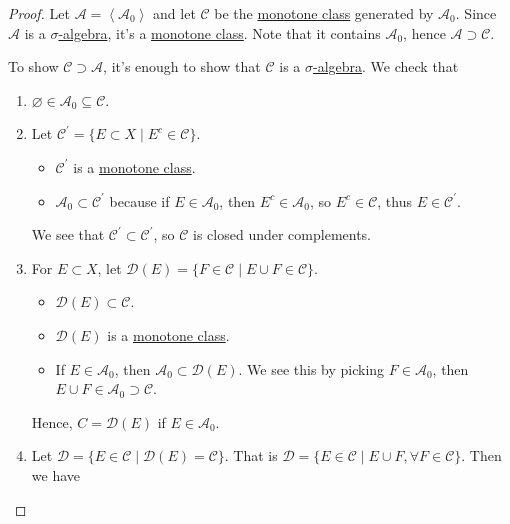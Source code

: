 \begin{proof}
	Let \(\mathcal{A}  = \left< \mathcal{A} _0 \right> \) and let \(\mathcal{C} \) be the \hyperref[def:monotone-class]{monotone class} generated by \(\mathcal{A} _0\). Since \(\mathcal{A} \) is a \hyperref[def:sigma-algebra]{\(\sigma\)-algebra}, it's a \hyperref[def:monotone-class]{monotone class}. Note that it contains \(\mathcal{A} _0\), hence \(\mathcal{A} \supset \mathcal{C} \).

	To show \(\mathcal{C} \supset \mathcal{A} \), it's enough to show that \(\mathcal{C} \) is a \hyperref[def:sigma-algebra]{\(\sigma\)-algebra}. We check that
	\begin{enumerate}
		\item \(\varnothing \in \mathcal{A} _0 \subseteq \mathcal{C} \).
		\item Let \(\mathcal{C} ^\prime = \{E\subset X \mid E^{c} \in \mathcal{C} \}\).
		      \begin{itemize}
			      \item \(\mathcal{C} ^\prime \) is a \hyperref[def:monotone-class]{monotone class}.
			      \item \(\mathcal{A} _0\subset \mathcal{C} ^\prime \) because if \(E\in \mathcal{A} _0\), then \(E^{c} \in \mathcal{A} _0\), so
			            \(E^{c} \in \mathcal{C} \), thus \(E\in \mathcal{C} ^\prime \).
		      \end{itemize}
		      We see that \(\mathcal{C} ^\prime \subset \mathcal{C}^\prime \), so \(\mathcal{C} \) is closed under complements.
		\item For \(E\subset X\), let \(\mathcal{D} (E) = \{F\in \mathcal{C} \mid E \cup F\in \mathcal{C} \}\).
		      \begin{itemize}
			      \item \(\mathcal{D} (E)\subset \mathcal{C} \).
			      \item \(\mathcal{D} (E)\) is a \hyperref[def:monotone-class]{monotone class}.
			      \item If \(E\in \mathcal{A} _0\), then \(\mathcal{A} _0\subset \mathcal{D} (E)\). We see this by picking \(F\in \mathcal{A} _0\), then
			            \(E\cup F\in \mathcal{A} _0\supset \mathcal{C} \).
		      \end{itemize}
		      Hence, \(C = \mathcal{D} (E)\) if \(E\in \mathcal{A} _0\).
		\item Let \(\mathcal{D} = \{E\in \mathcal{C} \mid \mathcal{D} (E) = \mathcal{C} \}\). That is \(\mathcal{D}  = \{E\in \mathcal{C} \mid E\cup F, \forall F\in \mathcal{C} \}\).
		      Then we have

\end{enumerate}
\end{proof}

